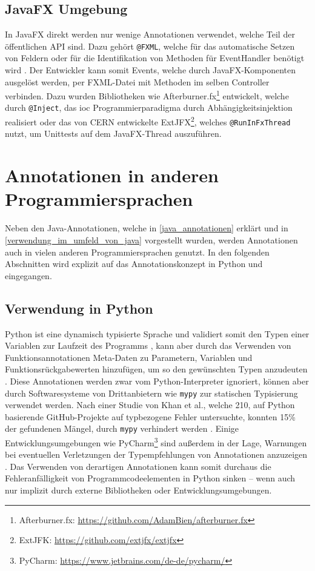 \subsection{JavaFX Umgebung}
\label{verwendung_im_umfeld_von_java_fx}
In JavaFX direkt werden nur wenige Annotationen verwendet, welche Teil der öffentlichen API sind. Dazu gehört \texttt{@FXML}, welche für das automatische Setzen von Feldern oder für die Identifikation von Methoden für EventHandler benötigt wird \cite{Anderson2019}. Der Entwickler kann somit Events, welche durch JavaFX-Komponenten ausgelöst werden, per FXML-Datei mit Methoden im selben Controller verbinden. Dazu wurden Bibliotheken wie Afterburner.fx\footnote{\label{ft:afterburner}Afterburner.fx: \url{https://github.com/AdamBien/afterburner.fx}} entwickelt, welche durch \texttt{@Inject}, das \ac{ioc} Programmierparadigma durch Abhängigkeitsinjektion realisiert oder das von CERN entwickelte ExtJFX\footnote{ExtJFK: \url{https://github.com/extjfx/extjfx}}, welches \texttt{@RunInFxThread} nutzt, um Unittests auf dem JavaFX-Thread auszuführen. 

\section{Annotationen in anderen Programmiersprachen}
\label{verwendung_in_anderen_sprachen}
Neben den Java-Annotationen, welche in \autoref{java_annotationen} erklärt und in \autoref{verwendung_im_umfeld_von_java} vorgestellt wurden, werden Annotationen auch in vielen anderen Programmiersprachen genutzt. In den folgenden Abschnitten wird explizit auf das Annotationskonzept in Python und \csharp eingegangen.
\subsection{Verwendung in Python}
\label{verwendung_in_python}
Python ist eine dynamisch typisierte Sprache und validiert somit den Typen einer Variablen zur Laufzeit des Programms \cite{Tratt2009}, kann aber durch das Verwenden von Funktionsannotationen Meta-Daten zu Parametern, Variablen und Funktionsrückgabewerten hinzufügen, um so den gewünschten Typen anzudeuten \cite{Rossum2014, Winter2006}. Diese Annotationen werden zwar vom Python-Interpreter ignoriert, können aber durch Softwaresysteme von Drittanbietern wie \texttt{mypy} zur statischen Typisierung verwendet werden. Nach einer Studie von Khan et al., welche 210, auf Python basierende GitHub-Projekte auf typbezogene Fehler untersuchte, konnten 15\% der gefundenen Mängel, durch \texttt{mypy} verhindert werden \cite{Khan2021}.
Einige Entwicklungsumgebungen wie PyCharm\footnote{PyCharm: \url{https://www.jetbrains.com/de-de/pycharm/}} sind außerdem in der Lage, Warnungen bei eventuellen Verletzungen der Typempfehlungen von Annotationen anzuzeigen \cite{Rother2017}. Das Verwenden von derartigen Annotationen kann somit durchaus die Fehleranfälligkeit von Programmcodeelementen in Python sinken -- wenn auch nur implizit durch externe Bibliotheken oder Entwicklungsumgebungen.
